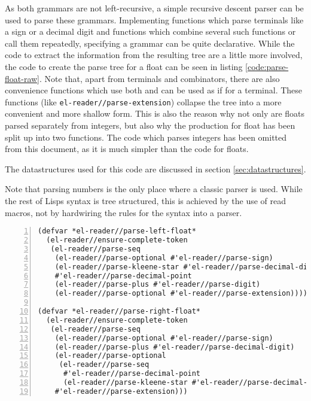 \documentclass[a4paper,10pt,twoside]{report}
\newcommand{\fun}[1]{\texttt{#1}}
\begin{document}
As both grammars are not left-recursive, a simple recursive descent parser can
be used to parse these grammars.  Implementing functions which parse terminals
like a sign or a decimal digit and functions which combine several such
functions or call them repeatedly, specifying a grammar can be quite
declarative.  While the code to extract the information from the resulting tree
are a little more involved, the code to create the parse tree for a float can be
seen in listing \ref{code:parse-float-raw}.  Note that, apart from terminals and
combinators, there are also convenience functions which use both and can be used
as if for a terminal.  These functions (like \fun{el-reader//parse-extension})
collapse the tree into a more convenient and more shallow form.  This is also
the reason why not only are floats parsed separately from integers, but also why
the production for float has been split up into two functions.  The code which
parses integers has been omitted from this document, as it is much simpler than
the code for floats.

The datastructures used for this code are discussed in section
\ref{sec:datastructures}.

Note that parsing numbers is the only place where a classic parser is used.
While the rest of Lisps syntax is tree structured, this is achieved by the use
of read macros, not by hardwiring the rules for the syntax into a parser.

\begin{lstlisting}[style=lispcode,label={code:parse-float-raw},caption={Create a
  function which parses a float into a tree.},numbers=left]
(defvar *el-reader//parse-left-float*
  (el-reader//ensure-complete-token
   (el-reader//parse-seq
    (el-reader//parse-optional #'el-reader//parse-sign)
    (el-reader//parse-kleene-star #'el-reader//parse-decimal-digit)
    #'el-reader//parse-decimal-point
    (el-reader//parse-plus #'el-reader//parse-digit)
    (el-reader//parse-optional #'el-reader//parse-extension))))

(defvar *el-reader//parse-right-float*
  (el-reader//ensure-complete-token
   (el-reader//parse-seq
    (el-reader//parse-optional #'el-reader//parse-sign)
    (el-reader//parse-plus #'el-reader//parse-decimal-digit)
    (el-reader//parse-optional
     (el-reader//parse-seq
      #'el-reader//parse-decimal-point
      (el-reader//parse-kleene-star #'el-reader//parse-decimal-digit)))
    #'el-reader//parse-extension)))
\end{lstlisting}
\end{document}
